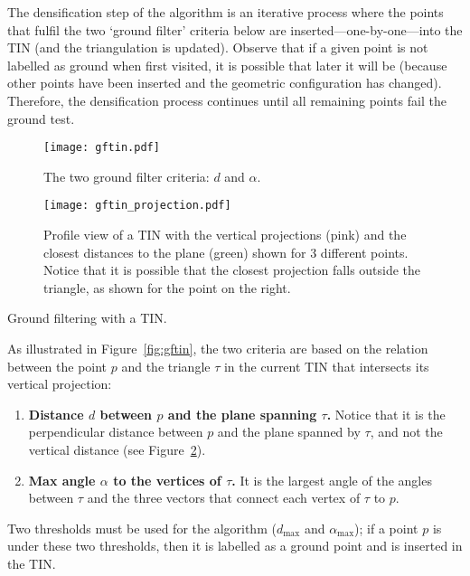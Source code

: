 The densification step of the algorithm is an iterative process where the points that fulfil the two `ground filter' criteria below are inserted---one-by-one---into the TIN (and the triangulation is updated).
Observe that if a given point is not labelled as ground when first visited, it is possible that later it will be (because other points have been inserted and the geometric configuration has changed).
Therefore, the densification process continues until all remaining points fail the ground test.
\begin{marginfigure}
  \centering
  \begin{subfigure}[b]{0.9\linewidth}
    \centering
    \texttt{[image: gftin.pdf]}
    \caption{The two ground filter criteria: $d$ and $\alpha$.}\label{fig:gftin_variables}
  \end{subfigure}
  \begin{subfigure}[b]{\linewidth}
    \centering
    \texttt{[image: gftin\_projection.pdf]}
    \caption{Profile view of a TIN with the vertical projections (pink) and the closest distances to the plane (green) shown for 3 different points. Notice that it is possible that the closest projection falls outside the triangle, as shown for the point on the right.}\label{fig:gftin_projection}
  \end{subfigure}
  \caption{Ground filtering with a TIN\@.}%
\label{fig:gftin}
\end{marginfigure}
As illustrated in Figure~\ref{fig:gftin}, the two criteria are based on the relation between the point $p$ and the triangle $\tau$ in the current TIN that intersects its vertical projection:
\begin{enumerate}
  \item \textbf{Distance $d$ between $p$ and the plane spanning $\tau$.} Notice that it is the perpendicular distance between $p$ and the plane spanned by $\tau$, and not the vertical distance (see Figure~\ref{fig:gftin_projection}).
  \item \textbf{Max angle $\alpha$ to the vertices of $\tau$.} It is the largest angle of the angles between $\tau$ and the three vectors that connect each vertex of $\tau$ to $p$. 
\end{enumerate}

%

Two thresholds must be used for the algorithm ($d_{\max}$ and $\alpha_{\max}$); if a point $p$ is under these two thresholds, then it is labelled as a ground point and is inserted in the TIN\@.

